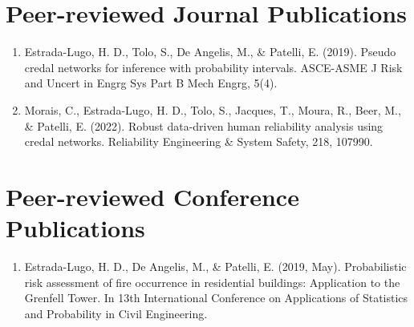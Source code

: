

\section*{Peer-reviewed Journal Publications}
\begin{enumerate}
    \item Estrada-Lugo, H. D., Tolo, S., De Angelis, M., \& Patelli, E. (2019). Pseudo credal networks for inference with probability intervals. ASCE-ASME J Risk and Uncert in Engrg Sys Part B Mech Engrg, 5(4).
    \item Morais, C., Estrada-Lugo, H. D., Tolo, S., Jacques, T., Moura, R., Beer, M., \& Patelli, E. (2022). Robust data-driven human reliability analysis using credal networks. Reliability Engineering \& System Safety, 218, 107990.
\end{enumerate}


\section*{Peer-reviewed Conference Publications}
\begin{enumerate}
    \item Estrada-Lugo, H. D., De Angelis, M., \& Patelli, E. (2019, May). Probabilistic risk assessment of fire occurrence in residential buildings: Application to the Grenfell Tower. In 13th International Conference on Applications of Statistics and Probability in Civil Engineering.
\end{enumerate}

% 



